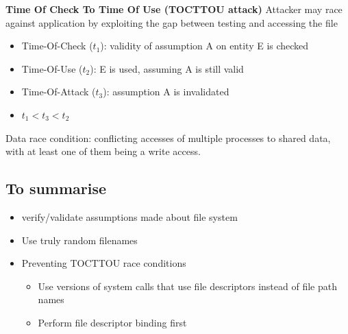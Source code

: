 \documentclass{article}
\begin{document}
\textbf{Time Of Check To Time Of Use (TOCTTOU attack)}
Attacker may race against application by exploiting the gap between testing and accessing the file
\begin{itemize}
    \item Time-Of-Check ($t_1$): validity of assumption A on entity E is checked
    \item Time-Of-Use ($t_2$): E is used, assuming A is still valid
    \item Time-Of-Attack ($t_3$): assumption A is invalidated
    \item $t_1 < t_3 < t_2$
\end{itemize}
Data race condition: conflicting accesses of multiple processes to shared data, with at least one of them being a write access.

\subsection{To summarise}
\begin{itemize}
    \item verify/validate assumptions made about file system
    \item Use truly random filenames
    \item Preventing TOCTTOU race conditions
    \begin{itemize}
        \item Use versions of system calls that use file descriptors instead of file path names
        \item Perform file descriptor binding first
    \end{itemize}
\end{itemize}
\end{document}
